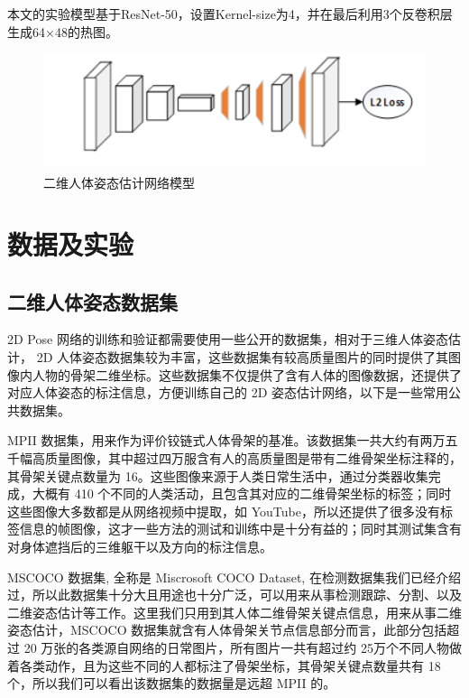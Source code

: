 本文的实验模型基于ResNet-50，设置Kernel-size为4，并在最后利用3个反卷积层生成64×48的热图。

\begin{figure}[h]
	\centering
	\includegraphics[scale=0.4]{figures/19.png}
	\caption{二维人体姿态估计网络模型\textsuperscript{\cite{p25}}}
	\label{fig:f19}
\end{figure}



\section{数据及实验}
\subsection{二维人体姿态数据集}{}

2D Pose 网络的训练和验证都需要使用一些公开的数据集，相对于三维人体姿态估计， 2D 人体姿态数据集较为丰富，这些数据集有较高质量图片的同时提供了其图像内人物的骨架二维坐标。这些数据集不仅提供了含有人体的图像数据，还提供了对应人体姿态的标注信息，方便训练自己的 2D 姿态估计网络，以下是一些常用公共数据集。

MPII 数据集，用来作为评价铰链式人体骨架的基准。该数据集一共大约有两万五千幅高质量图像，其中超过四万服含有人的高质量图是带有二维骨架坐标注释的，其骨架关键点数量为 16。这些图像来源于人类日常生活中，通过分类器收集完成，大概有 410 个不同的人类活动，且包含其对应的二维骨架坐标的标签；同时这些图像大多数都是从网络视频中提取，如 YouTube，所以还提供了很多没有标签信息的帧图像，这才一些方法的测试和训练中是十分有益的；同时其测试集含有对身体遮挡后的三维躯干以及方向的标注信息。

MSCOCO 数据集, 全称是 Miscrosoft COCO Dataset, 在检测数据集我们已经介绍过，所以此数据集十分大且用途也十分广泛，可以用来从事检测跟踪、分割、以及二维姿态估计等工作。这里我们只用到其人体二维骨架关键点信息，用来从事二维姿态估计，MSCOCO 数据集就含有人体骨架关节点信息部分而言，此部分包括超过 20 万张的各类源自网络的日常图片，所有图片一共有超过约 25万个不同人物做着各类动作，且为这些不同的人都标注了骨架坐标，其骨架关键点数量共有 18 个，所以我们可以看出该数据集的数据量是远超 MPII 的。

